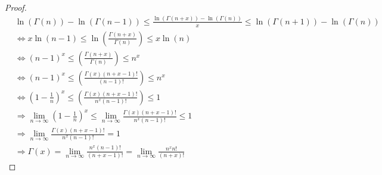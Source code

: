 \begin{proof}
\begin{equation}
\begin{split}
 & \ln(\Gamma(n))-\ln(\Gamma(n-1)) \le \frac{\ln(\Gamma(n+x))-\ln(\Gamma(n))}{x} \le \ln(\Gamma(n+1))-\ln(\Gamma(n)) \\
 & \iff x \ln(n-1) \le \ln \left( \frac{\Gamma(n+x)}{\Gamma(n)} \right) \le x\ln(n)\\
 & \iff (n-1)^x \le \left( \frac{\Gamma(n+x)}{\Gamma(n)} \right) \le n^x \\
 & \iff (n-1)^x \le \left( \frac{\Gamma(x)(n+x-1)!}{(n-1)!} \right) \le n^x \\
 & \iff \left(1-\frac{1}{n}\right)^x \le \left( \frac{\Gamma(x)(n+x-1)!}{n^x(n-1)!} \right) \le 1\\
 & \Longrightarrow \lim_{n\rightarrow \infty} \left(1-\frac{1}{n}\right)^x \le \lim_{n\rightarrow \infty}  \frac{\Gamma(x)(n+x-1)!}{n^x(n-1)!} \le 1 \\
 & \Longrightarrow \lim_{n\rightarrow \infty} \frac{\Gamma(x)(n+x-1)!}{n^x(n-1)!}  = 1 \\
 & \Longrightarrow \Gamma(x) = \lim_{n\rightarrow \infty} \frac{n^x(n-1)!}{(n+x-1)!}  = \lim_{n\rightarrow \infty} \frac{n^xn!}{(n+x)!}
\end{split}
\end{equation}



\end{proof}

